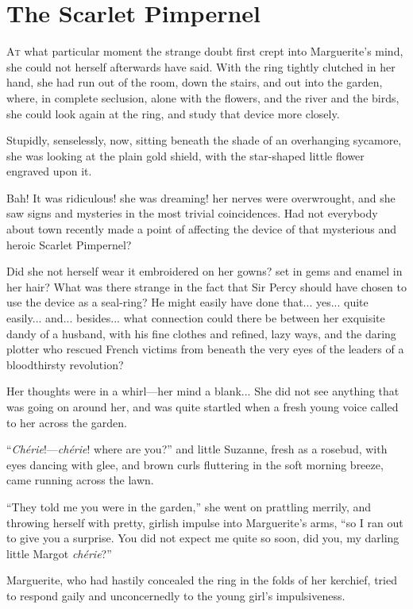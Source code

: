
\chapter{The Scarlet Pimpernel}
\lettrine[lines=4]{A}{t} what particular moment the strange doubt first crept into Marguerite's mind, she could not herself afterwards have said. With the ring tightly clutched in her hand, she had run out of the room, down the stairs, and out into the garden, where, in complete seclusion, alone with the flowers, and the river and the birds, she could look again at the ring, and study that device more closely.

Stupidly, senselessly, now, sitting beneath the shade of an overhanging sycamore, she was looking at the plain gold shield, with the star-shaped little flower engraved upon it.

Bah! It was ridiculous! she was dreaming! her nerves were overwrought, and she saw signs and mysteries in the most trivial coincidences. Had not everybody about town recently made a point of affecting the device of that mysterious and heroic Scarlet Pimpernel?

Did she not herself wear it embroidered on her gowns? set in gems and enamel in her hair? What was there strange in the fact that Sir Percy should have chosen to use the device as a seal-ring? He might easily have done that... yes... quite easily... and... besides... what connection could there be between her exquisite dandy of a husband, with his fine clothes and refined, lazy ways, and the daring plotter who rescued French victims from beneath the very eyes of the leaders of a bloodthirsty revolution?

Her thoughts were in a whirl---her mind a blank... She did not see anything that was going on around her, and was quite startled when a fresh young voice called to her across the garden.

\enquote{\textit{Chérie}!---\textit{chérie}! where are you?} and little Suzanne, fresh as a rosebud, with eyes dancing with glee, and brown curls fluttering in the soft morning breeze, came running across the lawn.

\enquote{They told me you were in the garden,} she went on prattling merrily, and throwing herself with pretty, girlish impulse into Marguerite's arms, \enquote{so I ran out to give you a surprise. You did not expect me quite so soon, did you, my darling little Margot \textit{chérie}?}

Marguerite, who had hastily concealed the ring in the folds of her kerchief, tried to respond gaily and unconcernedly to the young girl's impulsiveness.


